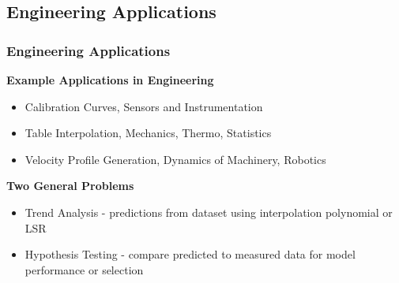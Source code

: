 \documentclass[fleqn]{beamer} %
\newcommand{\sectionIsubsectionIItitle}{Engineering Applications}
\newcommand{\sectionIsubsectionIIItitle}{}
\newcommand{\sectionIsubsectionIVtitle}{}
\begin{document}
		\subsection{\sectionIsubsectionIItitle}\label{sectionIsubsectionII}

			\begin{frame}
				\frametitle{\sectionIsubsectionIItitle}
				\bigskip
        \textbf{\small Example Applications in Engineering}
        \begin{itemize}
          
          \item Calibration Curves, Sensors and Instrumentation
          \item Table Interpolation, Mechanics, Thermo, Statistics
          \item Velocity Profile Generation, Dynamics of Machinery, Robotics
        
        \end{itemize}
        \vspace{5mm}
        \textbf{\small Two General Problems}        
        \begin{itemize}
          \item Trend Analysis - predictions from dataset using interpolation polynomial or LSR
          \item Hypothesis Testing - compare predicted to measured data for model performance or selection
        \end{itemize}
				
				\btVFill
			\end{frame}



				


			 


\end{document}
